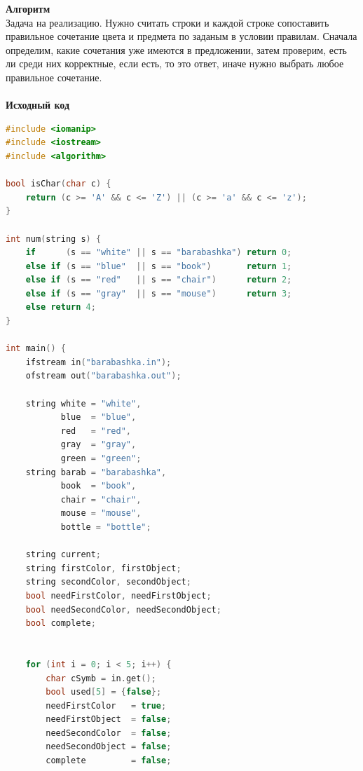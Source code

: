 \documentclass[a4paper,12pt]{article}
\begin{document}
\textbf{{\large Алгоритм}} \\
Задача на реализацию. Нужно считать строки и каждой строке сопоставить правильное сочетание цвета и предмета по заданым в условии правилам. Сначала определим, какие сочетания уже имеются в предложении, затем проверим, есть ли среди них корректные, если есть, то это ответ, иначе нужно выбрать любое правильное сочетание. \\ 
\\
\textbf{{\large Исходный код}}
\begin{lstlisting}[language=C++]
#include <iomanip>
#include <iostream>
#include <algorithm>

bool isChar(char c) {
    return (c >= 'A' && c <= 'Z') || (c >= 'a' && c <= 'z');
}

int num(string s) {
    if      (s == "white" || s == "barabashka") return 0;
    else if (s == "blue"  || s == "book")       return 1;
    else if (s == "red"   || s == "chair")      return 2;
    else if (s == "gray"  || s == "mouse")      return 3;
    else return 4;
}
 
int main() {
    ifstream in("barabashka.in");
    ofstream out("barabashka.out");
    
    string white = "white",
           blue  = "blue",
           red   = "red",
           gray  = "gray",
           green = "green";
    string barab = "barabashka",
           book  = "book",
           chair = "chair",
           mouse = "mouse",
           bottle = "bottle";
    
    string current;
    string firstColor, firstObject;
    string secondColor, secondObject;
    bool needFirstColor, needFirstObject;
    bool needSecondColor, needSecondObject;
    bool complete;
    
    
    for (int i = 0; i < 5; i++) {
        char cSymb = in.get();
        bool used[5] = {false};
        needFirstColor   = true;
        needFirstObject  = false;
        needSecondColor  = false;
        needSecondObject = false;
        complete         = false;
        

\end{lstlisting}
\end{document}
